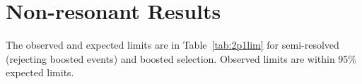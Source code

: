 \section{Non-resonant Results}




The observed and expected limits are in Table~\ref{tab:2p1lim} for semi-resolved (rejecting boosted events) and boosted selection. Observed limits are within 95\% expected limits. %

